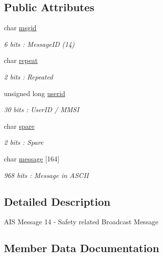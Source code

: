 \subsection*{Public Attributes}
\begin{DoxyCompactItemize}
\item 
char \mbox{\hyperlink{structaismsg__14_a930eeeadf11506affdb9327684967760}{msgid}}
\begin{DoxyCompactList}\small\item\em 6 bits \+: Message\+ID (14) \end{DoxyCompactList}\item 
char \mbox{\hyperlink{structaismsg__14_a058e616dc9f292c9d934e27ae8653115}{repeat}}
\begin{DoxyCompactList}\small\item\em 2 bits \+: Repeated \end{DoxyCompactList}\item 
unsigned long \mbox{\hyperlink{structaismsg__14_a6e8df8523bb1037792f63fb8fed6f197}{userid}}
\begin{DoxyCompactList}\small\item\em 30 bits \+: User\+ID / M\+M\+SI \end{DoxyCompactList}\item 
char \mbox{\hyperlink{structaismsg__14_adc2fad7168452cecc3bf07c0f5116129}{spare}}
\begin{DoxyCompactList}\small\item\em 2 bits \+: Spare \end{DoxyCompactList}\item 
char \mbox{\hyperlink{structaismsg__14_a1150bcf23ebb1430d5dfebf237d2576d}{message}} \mbox{[}164\mbox{]}
\begin{DoxyCompactList}\small\item\em 968 bits \+: Message in A\+S\+C\+II \end{DoxyCompactList}\end{DoxyCompactItemize}


\subsection{Detailed Description}
A\+IS Message 14 -\/ Safety related Broadcast Message 

\subsection{Member Data Documentation}
\mbox{\label{structaismsg__14_a1150bcf23ebb1430d5dfebf237d2576d}} 
